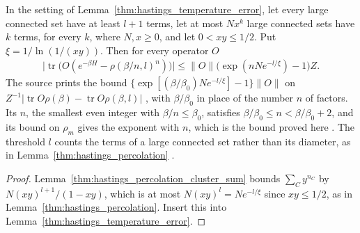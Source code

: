 \begin{theorem}
    \label{thm:hastings_temperature_error_percolation}
    \leanok
    In the setting of Lemma~\ref{thm:hastings_temperature_error}, let every
    large connected set have at least $l+1$ terms, let at most $Nx^k$ large
    connected sets have $k$ terms, for every $k$, where $N,x\ge0$, and let
    $0<xy\le1/2$. Put $\xi=1/\ln(1/(xy))$. Then for every operator $O$
    \begin{align*}
        \bigl|\operatorname{tr}\bigl(O(e^{-\beta H}-\rho(\beta/n,l)^n)\bigr)\bigr|
        \le\|O\|\bigl(\exp(nNe^{-l/\xi})-1\bigr)Z.
    \end{align*}
    The source prints the bound
    $\{\exp[(\beta/\beta_0)Ne^{-l/\xi}]-1\}\|O\|$ on
    $Z^{-1}|\operatorname{tr}O\rho(\beta)-\operatorname{tr}O\rho(\beta,l)|$
    \cite[lines 1342--1347]{Hastings2006Solving}, with $\beta/\beta_0$ in place of
    the number $n$ of factors. Its $n$, the smallest even integer with
    $\beta/n\le\beta_0$, satisfies $\beta/\beta_0\le n<\beta/\beta_0+2$, and its bound
    on $\rho_m$ gives the exponent with $n$, which is the bound proved here
    \cite{gap:hastings05_temperature_factor_count}. The threshold $l$ counts the
    terms of a large connected set rather than its diameter, as in
    Lemma~\ref{thm:hastings_percolation}
    \cite{gap:hastings05_percolation_cluster_size}.
\end{theorem}

\begin{proof}
    \leanok
    Lemma~\ref{thm:hastings_percolation_cluster_sum} bounds
    $\sum_Cy^{n_C}$ by $N(xy)^{l+1}/(1-xy)$, which is at most
    $N(xy)^l=Ne^{-l/\xi}$ since $xy\le1/2$, as in
    Lemma~\ref{thm:hastings_percolation}. Insert this into
    Lemma~\ref{thm:hastings_temperature_error}.
\end{proof}

